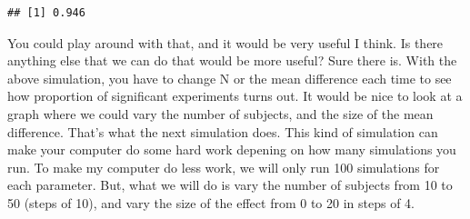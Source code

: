 \documentclass[
]{book}
\newenvironment{Shaded}{\begin{snugshade}}{\end{snugshade}}
\newcommand{\ControlFlowTok}[1]{\textcolor[rgb]{0.13,0.29,0.53}{\textbf{#1}}}
\newcommand{\DataTypeTok}[1]{\textcolor[rgb]{0.13,0.29,0.53}{#1}}
\newcommand{\DecValTok}[1]{\textcolor[rgb]{0.00,0.00,0.81}{#1}}
\newcommand{\FloatTok}[1]{\textcolor[rgb]{0.00,0.00,0.81}{#1}}
\newcommand{\KeywordTok}[1]{\textcolor[rgb]{0.13,0.29,0.53}{\textbf{#1}}}
\newcommand{\NormalTok}[1]{#1}
\newcommand{\OperatorTok}[1]{\textcolor[rgb]{0.81,0.36,0.00}{\textbf{#1}}}
\newcommand{\OtherTok}[1]{\textcolor[rgb]{0.56,0.35,0.01}{#1}}
\newcommand{\StringTok}[1]{\textcolor[rgb]{0.31,0.60,0.02}{#1}}
\begin{document}
\begin{Shaded}
\end{Shaded}

\begin{verbatim}
## [1] 0.946
\end{verbatim}

You could play around with that, and it would be very useful I think. Is there anything else that we can do that would be more useful? Sure there is. With the above simulation, you have to change N or the mean difference each time to see how proportion of significant experiments turns out. It would be nice to look at a graph where we could vary the number of subjects, and the size of the mean difference. That's what the next simulation does. This kind of simulation can make your computer do some hard work depening on how many simulations you run. To make my computer do less work, we will only run 100 simulations for each parameter. But, what we will do is vary the number of subjects from 10 to 50 (steps of 10), and vary the size of the effect from 0 to 20 in steps of 4.
\end{document}

